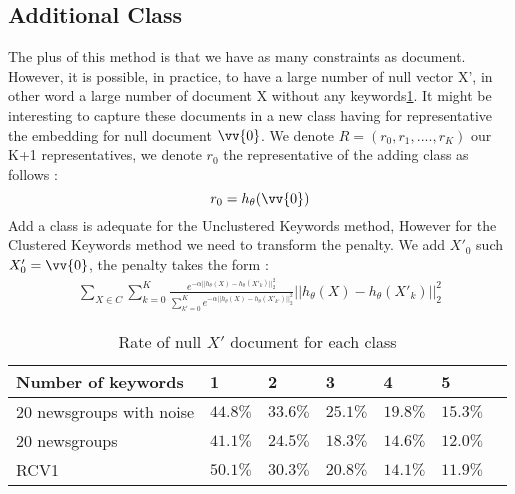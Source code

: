 \subsection{Additional Class}
The plus of this method is that we have as many constraints as document. 
However, it is possible, in practice, to have a large number of null vector X', 
in other word a large number of  document X without any keywords\ref{table:null_prime}.
It might be interesting to capture these documents in a new class having
for representative the embedding for null document $\vv{0}$. We denote    
$R=(r_0, r_1, ...., r_K)$ our K+1 representatives, we denote 
$r_0$ the representative of the adding class as follows : 
\begin{equation}
r_0 = h_\theta(\vv{0})
\end{equation}
Add a class is adequate for the Unclustered Keywords method, However for the
Clustered Keywords method we need to transform the penalty.  
We add $X'_0$ such $X'_0 = \vv{0}$, the penalty takes the form :
\begin{equation}\label{eq:k_add}
\begin{array}{l}
  \sum\limits_{X \in C} \sum\limits_{k = 0}^K \frac{e^{-\alpha|| h_\theta(X) - 
h_\theta(X'_k)||_2^2}}{\sum\limits_{k' = 0}^K e^{-\alpha|| h_\theta(X) - 
h_\theta(X'_{k'})||_2^2}}|| h_\theta(X) - h_\theta(X'_{k})||_2^2
\end{array}
\end{equation}
\begin{table}[h]
\centering
\caption{\label{table:null_prime}Rate of null $X'$ document for each class}
  \begin{tabular}{|l|l|l|l|l|l|l|}
    \hline
     Number of keywords         & 1      &2       & 3      & 4      & 5\\ \hline
     20 newsgroups with noise   &$44.8\%$&$33.6\%$&$25.1\%$&$19.8\%$&$15.3\%$ \\ \hline
     20 newsgroups&$41.1\%$&$24.5\%$&$18.3\%$&$14.6\%$&$12.0\%$ \\ \hline
     RCV1         &$50.1\%$&$30.3\%$&$20.8\%$&$14.1\%$&$11.9\%$ \\ \hline
  \end{tabular}
\end{table}
